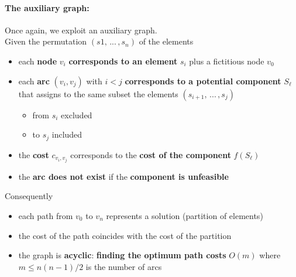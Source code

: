 \documentclass[11pt]{article}
\begin{document}
	\paragraph{The auxiliary graph:} Once again, we exploit an auxiliary graph. \\
	Given the permutation $(s1, \, ... \, , s_n)$ of the elements
	\begin{itemize}
		\item each \textbf{node} $v_i$ \textbf{corresponds to an element} $s_i$ plus a fictitious node $v_0$
		
		\item each \textbf{arc} $(v_i , v_j )$ with $i < j$ \textbf{corresponds to a potential component} $S_{\ell}$ that assigns to the same subset the elements $(s_{i+1}, \, ... \, , s_j)$
		\begin{itemize}
			\item from $s_i$ excluded
			\item to $s_j$ included
		\end{itemize}
		
		\item the \textbf{cost} $c_{v_i ,v_j}$ corresponds to the \textbf{cost of the component} $f (S_{\ell})$
		
		\item the \textbf{arc does not exist} if the \textbf{component is unfeasible}
	\end{itemize}
	
	Consequently
	\begin{itemize}
		\item each path from $v_0$ to $v_n$ represents a solution (partition of elements)
		
		\item the cost of the path coincides with the cost of the partition
		
		\item the graph is \textbf{acyclic}: \textbf{finding the optimum path costs} $O (m)$ where $m \le n (n − 1) /2$ is the number of arcs
	\end{itemize}
	
	\newpage
	
\end{document}
